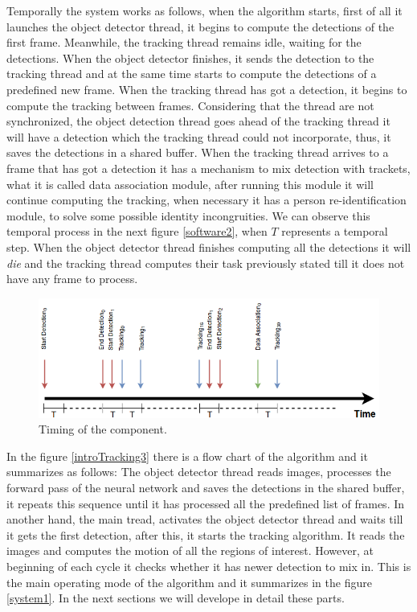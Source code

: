 Temporally the system works as follows, when the algorithm starts, first of all it launches the object detector thread, it begins to compute the detections of the first frame. Meanwhile, the tracking thread remains idle, waiting for the detections. When the object detector finishes, it sends the detection to the tracking thread and at the same time starts to compute the detections of a predefined new frame. When the tracking thread has got a detection, it begins to compute the tracking between frames. Considering that the thread are not synchronized, the object detection thread goes ahead of the tracking thread it will have a detection which the tracking thread could not incorporate, thus, it saves the detections in a shared buffer. When the tracking thread arrives to a frame that has got a detection it has a mechanism to mix detection with trackets, what it is called data association module, after running this module it will continue computing the tracking, when necessary it has a person re-identification module, to solve some possible identity incongruities. We can observe this temporal process in the next figure \ref{software2}, when $T$ represents a temporal step. When the object detector thread finishes computing all the detections it will \textit{die} and the tracking thread computes their task previously stated till it does not have any frame to process.


\begin{figure}[H]
\centering         
\includegraphics[width=14cm]{timesDiagram/timing.png}
\caption{Timing of the component.} \label{intro1}
\end{figure}


In the figure \ref{introTracking3} there is a flow chart of the algorithm and it summarizes as follows: The object detector thread reads images, processes the forward pass of the neural network and saves the detections in the shared buffer, it repeats this sequence until it has processed all the predefined list of frames. In another hand, the main tread, activates the object detector thread and waits till it gets the first detection, after this, it starts the tracking algorithm. It reads the images and computes the motion of all the regions of interest. However, at beginning of each cycle it checks whether it has newer detection to mix in. This is the main operating mode of the algorithm and it summarizes in the figure \ref{system1}. In the next sections we will develope in detail these parts. 

